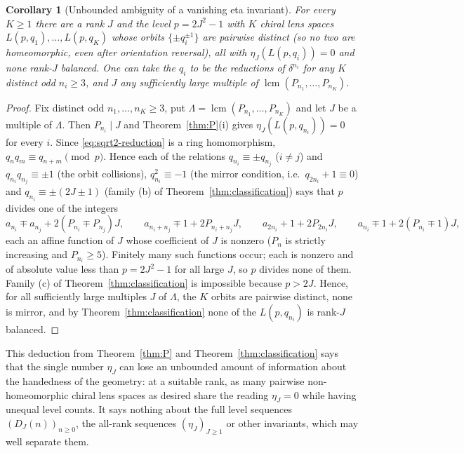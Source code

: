\documentclass[11pt]{article}
\newtheorem{corollary}[theorem]{Corollary}
\theoremstyle{definition}
\begin{document}
\begin{corollary}[Unbounded ambiguity of a vanishing eta invariant]
\label{cor:ambiguity}
For every $K\geq1$ there are a rank $J$ and the level $p=2J^2-1$ with
$K$ chiral lens spaces $L(p,q_1),\ldots,L(p,q_K)$ whose orbits
$\{\pm q_i^{\pm1}\}$ are pairwise distinct (so no two are homeomorphic,
even after orientation reversal), all with $\eta_J(L(p,q_i))=0$ and
none rank-$J$ balanced.  One can take the $q_i$ to be the reductions of
$\delta^{n_i}$ for any $K$ distinct odd $n_i\geq3$, and $J$ any
sufficiently large multiple of
$\operatorname{lcm}(P_{n_1},\ldots,P_{n_K})$.
\end{corollary}

\begin{proof}
Fix distinct odd $n_1,\ldots,n_K\geq3$, put
$\Lambda=\operatorname{lcm}(P_{n_1},\ldots,P_{n_K})$ and let $J$ be a
multiple of $\Lambda$.  Then $P_{n_i}\mid J$ and Theorem~\ref{thm:P}(i)
gives $\eta_J(L(p,q_{n_i}))=0$ for every $i$.  Since
\eqref{eq:sqrt2-reduction} is a ring homomorphism,
$q_nq_m\equiv q_{n+m}\pmod p$.  Hence each of the relations
$q_{n_i}\equiv\pm q_{n_j}$ ($i\neq j$) and $q_{n_i}q_{n_j}\equiv\pm1$
(the orbit collisions), $q_{n_i}^2\equiv-1$ (the mirror condition,
i.e.\ $q_{2n_i}+1\equiv0$) and $q_{n_i}\equiv\pm(2J\pm1)$ (family (b)
of Theorem~\ref{thm:classification}) says that $p$ divides one of the
integers
\[
 a_{n_i}\mp a_{n_j}+2(P_{n_i}\mp P_{n_j})J,\qquad
 a_{n_i+n_j}\mp1+2P_{n_i+n_j}J,\qquad
 a_{2n_i}+1+2P_{2n_i}J,\qquad
 a_{n_i}\mp1+2(P_{n_i}\mp1)J,
\]
each an affine function of $J$ whose coefficient of $J$ is nonzero
($P_n$ is strictly increasing and $P_{n_i}\geq5$).  Finitely many such
functions occur; each is nonzero and of absolute value less than
$p=2J^2-1$ for all large $J$, so $p$ divides none of them.  Family (c)
of Theorem~\ref{thm:classification} is impossible because $p>2J$.
Hence, for all sufficiently large multiples $J$ of $\Lambda$, the $K$
orbits are pairwise distinct, none is mirror, and by
Theorem~\ref{thm:classification} none of the $L(p,q_{n_i})$ is rank-$J$
balanced.
\end{proof}

This deduction from Theorem~\ref{thm:P} and
Theorem~\ref{thm:classification} says that the single
number $\eta_J$ can lose an unbounded amount of information about the
handedness of the geometry: at a suitable rank, as many pairwise
non-homeomorphic chiral lens spaces as desired share the reading
$\eta_J=0$ while having unequal level counts.  It says nothing about the
full level sequences $(D_J(n))_{n\geq0}$, the all-rank sequences
$(\eta_J)_{J\geq1}$ or other invariants, which may well separate them.
\end{document}
